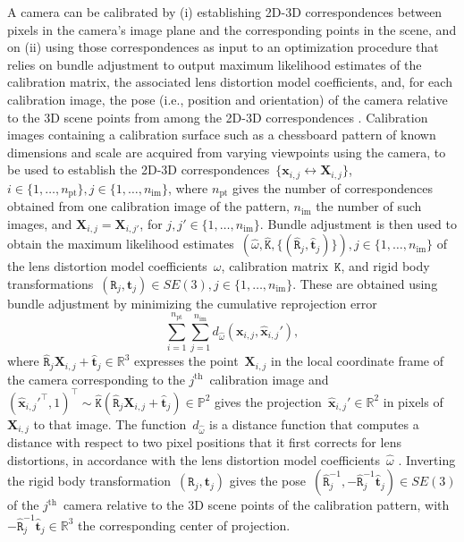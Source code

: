 \documentclass[review]{elsarticle}
\begin{document}
A camera can be calibrated by (i) establishing 2D-3D correspondences between pixels in the camera's image plane and the corresponding points in the scene, and on (ii) using those correspondences as input to an optimization procedure that relies on bundle adjustment \cite{triggs1999bundle} to output maximum likelihood estimates of the calibration matrix, the associated lens distortion model coefficients, and, for each calibration image, the pose (i.e., position and orientation) of the camera relative to the 3D scene points from among the 2D-3D correspondences \cite{Hartley2004,zhang2000flexible}. Calibration images containing a calibration surface such as a chessboard pattern of known dimensions and scale are acquired from varying viewpoints using the camera, to be used to establish the 2D-3D correspondences~$\{\mathbf{x}_{i,j} \leftrightarrow \mathbf{X}_{i,j}\}$, $i \in \{ 1, \dots, n_\text{pt} \}, j \in \{ 1, \dots, n_\text{im} \}$, where $n_\text{pt}$ gives the number of correspondences obtained from one calibration image of the pattern, $n_\text{im}$ the number of such images, and $\mathbf{X}_{i,j} = \mathbf{X}_{i,j'}$, for $j, j' \in \{ 1, \dots, n_\text{im} \}$. Bundle adjustment is then used to obtain the maximum likelihood estimates~$(\hat{\omega}, \hat{\mathtt{K}}, \{(\hat{\mathtt{R}}_j, \hat{\mathbf{t}}_j)\}), j \in \{ 1, \dots, n_\text{im} \}$ of the lens distortion model coefficients~$\omega$, calibration matrix~$\mathtt{K}$, and rigid body transformations~$(\mathtt{R}_j, \mathbf{t}_j) \in SE(3), j \in \{ 1, \dots, n_\text{im} \}$. These are obtained using bundle adjustment by minimizing the cumulative reprojection error
\begin{equation}
\sum_{i=1}^{n_\text{pt}} \sum_{j=1}^{n_\text{im}} d_{\hat{\omega}}(\mathbf{x}_{i,j}, \hat{\mathbf{x}}_{i,j}'),
\label{re}
\end{equation}
where $\hat{\mathtt{R}}_j\mathbf{X}_{i,j} + \hat{\mathbf{t}}_j \in \mathbb{R}^3$ expresses the point~$\mathbf{X}_{i,j}$ in the local coordinate frame of the camera corresponding to the $j^{\text{th}}$~calibration image and $(\hat{\mathbf{x}}_{i,j}'^\top, 1)^\top \sim \hat{\mathtt{K}}(\hat{\mathtt{R}}_j\mathbf{X}_{i,j} + \hat{\mathbf{t}}_j) \in \mathbb{P}^2$ gives the projection~$\hat{\mathbf{x}}_{i,j}' \in \mathbb{R}^2$ in pixels of $\mathbf{X}_{i,j}$ to that image. The function~$d_{\hat{\omega}}$ is a distance function that computes a distance with respect to two pixel positions that it first corrects for lens distortions, in accordance with the lens distortion model coefficients~$\hat{\omega}$ \cite{duane1971close,weng1992camera}. Inverting the rigid body transformation~$(\mathtt{R}_j, \mathbf{t}_j)$ gives the pose~$(\hat{\mathtt{R}}_j^{-1}, -\hat{\mathtt{R}}_j^{-1}\hat{\mathbf{t}}_j^{}) \in SE(3)$ of the $j^{\text{th}}$~camera relative to the 3D scene points of the calibration pattern, with $-\hat{\mathtt{R}}_j^{-1}\hat{\mathbf{t}}_j^{} \in \mathbb{R}^3$ the corresponding center of projection.
\end{document}
